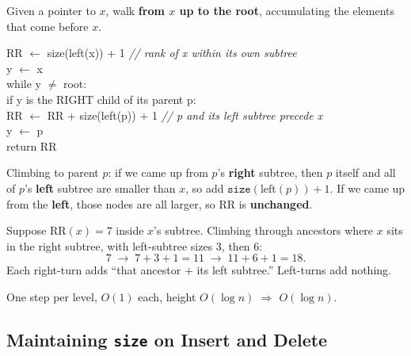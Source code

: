 \documentclass[11pt]{article}
\begin{document}
Given a pointer to $x$, walk \textbf{from $x$ up to the root}, accumulating the elements that come before $x$.

\begin{codebox}
\ttfamily RR $\leftarrow$ size(left(x)) + 1 \hfill\textnormal{\itshape // rank of x within its own subtree}\\
\ttfamily y $\leftarrow$ x\\
\ttfamily while y $\ne$ root:\\
\ttfamily \hspace*{2em}if y is the RIGHT child of its parent p:\\
\ttfamily \hspace*{4em}RR $\leftarrow$ RR + size(left(p)) + 1 \hfill\textnormal{\itshape // p and its left subtree precede x}\\
\ttfamily \hspace*{2em}y $\leftarrow$ p\\
\ttfamily return RR
\end{codebox}

\begin{keybox}[Why]
Climbing to parent $p$: if we came up from $p$'s \textbf{right} subtree, then $p$ itself and all of $p$'s \textbf{left} subtree are smaller than $x$, so add $\texttt{size}(\text{left}(p))+1$. If we came up from the \textbf{left}, those nodes are all larger, so $\text{RR}$ is \textbf{unchanged}.
\end{keybox}

\begin{examplebox}
Suppose $\text{RR}(x)=7$ inside $x$'s subtree. Climbing through ancestors where $x$ sits in the right subtree, with left-subtree sizes $3$, then $6$:
$$7 \;\to\; 7 + 3 + 1 = 11 \;\to\; 11 + 6 + 1 = 18.$$
Each right-turn adds ``that ancestor $+$ its left subtree.'' Left-turns add nothing.
\end{examplebox}

\begin{keybox}
One step per level, $O(1)$ each, height $O(\log n)$ $\Rightarrow$ \textcolor{violetT}{$O(\log n)$}.
\end{keybox}

\subsection{Maintaining \texttt{size} on Insert and Delete}
\end{document}
